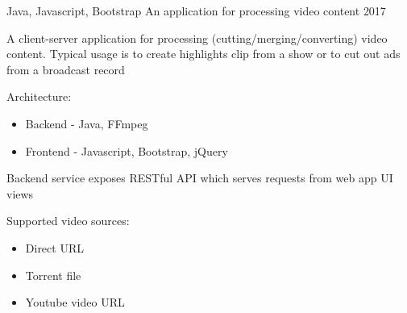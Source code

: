 \begin{cventries}
  \cventry
    {Java, Javascript, Bootstrap}
    {An application for processing video content}
    {}
    {2017}
    {
      \begin{cvitems} %
      	\item A client-server application for processing (cutting/merging/converting) video content. Typical usage is to create highlights clip from a show or to cut out ads from a broadcast record
        \item Architecture:
          \begin{itemize}
              \item Backend - Java, FFmpeg
              \item Frontend - Javascript, Bootstrap, jQuery
          \end{itemize}
		\item Backend service exposes RESTful API which serves requests from web app UI views
        \item Supported video sources:
          \begin{itemize}
              \item Direct URL
              \item Torrent file
              \item Youtube video URL
          \end{itemize}
      \end{cvitems}
    }
    
    
\end{cventries}
